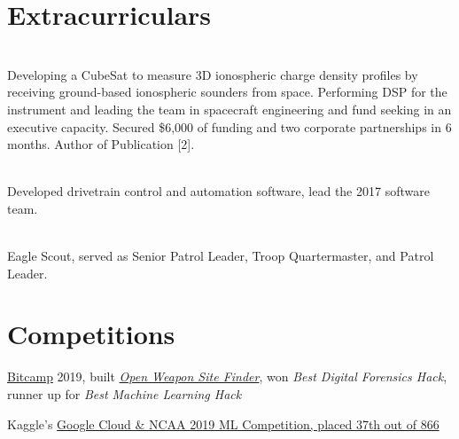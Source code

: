 \documentclass[]{deedy-resume-openfont}
\begin{document}
\begin{minipage}[t]{0.66\textwidth}
\section{Extracurriculars}

\vspace{0.125cm}

 \\
Developing a CubeSat to measure 3D ionospheric charge density profiles by receiving ground-based ionospheric sounders from space. Performing DSP for the instrument and leading the team in spacecraft engineering and fund seeking in an executive capacity. Secured \$6,000 of funding and two corporate partnerships in 6 months. Author of Publication [2].
\sectionsep


 \\
Developed drivetrain control and automation software, lead the 2017 software team.
\sectionsep

\vspace{-0.35cm}

 \\
Eagle Scout, served as Senior Patrol Leader, Troop Quartermaster, and Patrol Leader.
\sectionsep

\section{Competitions} 
\vspace{0.25cm}
\begin{tightemize}
    \item \href{https://bit.camp/}{Bitcamp} 2019, built \href{https://devpost.com/software/owsf}{\textit{Open Weapon Site Finder}}, won \textit{Best Digital Forensics Hack}, runner up for \textit{Best Machine Learning Hack}
    \item Kaggle's \href{https://www.kaggle.com/c/mens-machine-learning-competition-2019/leaderboard}{Google Cloud \& NCAA 2019 ML Competition, placed 37th out of 866}
\end{tightemize}
\sectionsep


\end{minipage}
\end{document}
